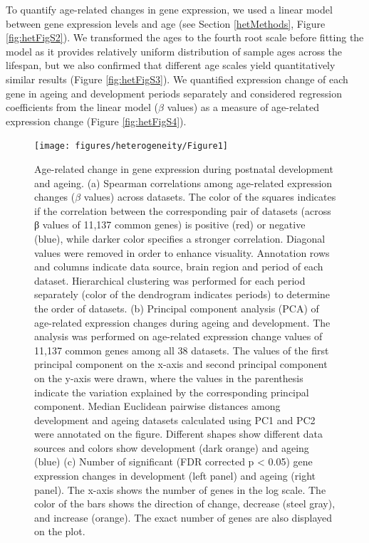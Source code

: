 \documentclass[12pt,twoside]{unicam}
\begin{document}
To quantify age-related changes in gene expression, we used a linear model between gene expression levels and age (see Section \ref{hetMethods}, Figure \ref{fig:hetFigS2}). We transformed the ages to the fourth root scale before fitting the model as it provides relatively uniform distribution of sample ages across the lifespan, but we also confirmed that different age scales yield quantitatively similar results (Figure \ref{fig:hetFigS3}). We quantified expression change of each gene in ageing and development periods separately and considered regression coefficients from the linear model (\(\beta\) values) as a measure of age-related expression change (Figure \ref{fig:hetFigS4}).

\begin{figure}

{\centering \texttt{[image: figures/heterogeneity/Figure1]} 

}

\caption[Age-related change in gene expression during postnatal development and ageing.]{Age-related change in gene expression during postnatal development and ageing. (a) Spearman correlations among age-related expression changes ($\beta$  values) across datasets. The color of the squares indicates if the correlation between the corresponding pair of datasets (across β values of 11,137 common genes) is positive (red) or negative (blue), while darker color specifies a stronger correlation. Diagonal values were removed in order to enhance visuality. Annotation rows and columns indicate data source, brain region and period of each dataset. Hierarchical clustering was performed for each period separately (color of the dendrogram indicates periods) to determine the order of datasets. (b) Principal component analysis (PCA) of age-related expression changes during ageing and development. The analysis was performed on age-related expression change values of 11,137 common genes among all 38 datasets. The values of the first principal component on the x-axis and second principal component on the y-axis were drawn, where the values in the parenthesis indicate the variation explained by the corresponding principal component. Median Euclidean pairwise distances among development and ageing datasets calculated using PC1 and PC2 were annotated on the figure. Different shapes show different data sources and colors show development (dark orange) and ageing (blue) (c) Number of significant (FDR corrected p < 0.05) gene expression changes in development (left panel) and ageing (right panel). The x-axis shows the number of genes in the log scale. The color of the bars shows the direction of change, decrease (steel gray), and increase (orange). The exact number of genes are also displayed on the plot.}\label{fig:hetFig1}
\end{figure}
\end{document}
